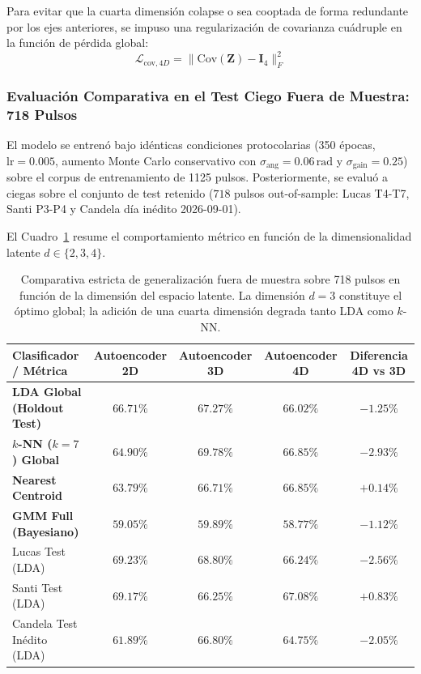 \documentclass[11pt,a4paper,openany]{book}
\theoremstyle{definition}
\begin{document}
Para evitar que la cuarta dimensión colapse o sea cooptada de forma redundante por los ejes anteriores, se impuso una regularización de covarianza cuádruple en la función de pérdida global:
\begin{equation}
    \mathcal{L}_{\text{cov}, 4D} = \|\text{Cov}(\mathbf{Z}) - \mathbf{I}_4\|_F^2
\end{equation}

\subsubsection{Evaluación Comparativa en el Test Ciego Fuera de Muestra: 718 Pulsos}

El modelo se entrenó bajo idénticas condiciones protocolarias (350 épocas, $\text{lr} = 0.005$, aumento Monte Carlo conservativo con $\sigma_{\text{ang}} = 0.06\,\text{rad}$ y $\sigma_{\text{gain}} = 0.25$) sobre el corpus de entrenamiento de 1125 pulsos. Posteriormente, se evaluó a ciegas sobre el conjunto de test retenido ($718$ pulsos out-of-sample: Lucas T4-T7, Santi P3-P4 y Candela día inédito 2026-09-01).

El Cuadro~\ref{tab:comparativa_2d_3d_4d_holdout} resume el comportamiento métrico en función de la dimensionalidad latente $d \in \{2, 3, 4\}$.

\begin{table}[H]
\centering
\small
\begin{tabular}{lcccc}
\hline
\textbf{Clasificador / Métrica} & \textbf{Autoencoder 2D} & \textbf{Autoencoder 3D} & \textbf{Autoencoder 4D} & \textbf{Diferencia 4D vs 3D} \\
\hline
\textbf{LDA Global (Holdout Test)} & $66.71\%$ & $\mathbf{67.27\%}$ & $66.02\%$ & \textbf{$-1.25\%$} \\
\textbf{$k$-NN ($k=7$) Global} & $64.90\%$ & $\mathbf{69.78\%}$ & $66.85\%$ & \textbf{$-2.93\%$} \\
\textbf{Nearest Centroid} & $63.79\%$ & $66.71\%$ & $\mathbf{66.85\%}$ & $+0.14\%$ \\
\textbf{GMM Full (Bayesiano)} & $59.05\%$ & $\mathbf{59.89\%}$ & $58.77\%$ & $-1.12\%$ \\
\hline
Lucas Test (LDA) & $\mathbf{69.23\%}$ & $68.80\%$ & $66.24\%$ & $-2.56\%$ \\
Santi Test (LDA) & $\mathbf{69.17\%}$ & $66.25\%$ & $67.08\%$ & $+0.83\%$ \\
Candela Test Inédito (LDA) & $61.89\%$ & $\mathbf{66.80\%}$ & $64.75\%$ & $-2.05\%$ \\
\hline
\end{tabular}
\caption{Comparativa estricta de generalización fuera de muestra sobre 718 pulsos en función de la dimensión del espacio latente. La dimensión $d=3$ constituye el óptimo global; la adición de una cuarta dimensión degrada tanto LDA como $k$-NN.}
\label{tab:comparativa_2d_3d_4d_holdout}
\end{table}
\end{document}
